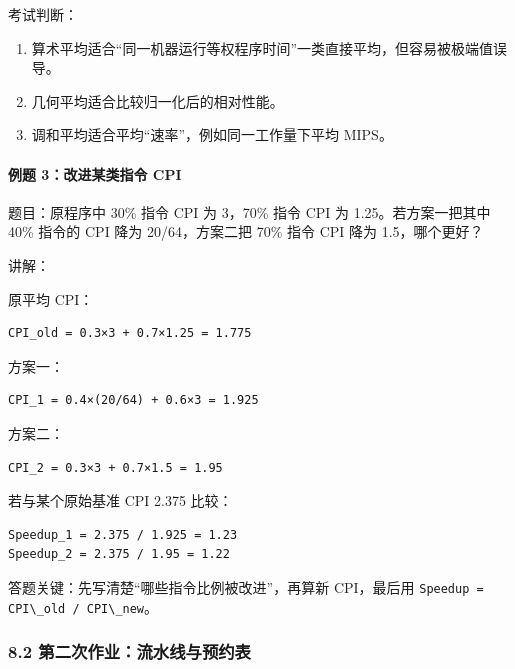 \documentclass[
]{ctexart}
\newcommand{\passthrough}[1]{#1}
\providecommand{\tightlist}{%
  \setlength{\itemsep}{0pt}\setlength{\parskip}{0pt}}
\begin{document}
考试判断：

\begin{enumerate}
\def\labelenumi{\arabic{enumi}.}
\tightlist
\item
  算术平均适合``同一机器运行等权程序时间''一类直接平均，但容易被极端值误导。
\item
  几何平均适合比较归一化后的相对性能。
\item
  调和平均适合平均``速率''，例如同一工作量下平均 MIPS。
\end{enumerate}

\paragraph{例题 3：改进某类指令
CPI}\label{ux4f8bux9898-3ux6539ux8fdbux67d0ux7c7bux6307ux4ee4-cpi}

题目：原程序中 30\% 指令 CPI 为 3，70\% 指令 CPI 为 1.25。若方案一把其中
40\% 指令的 CPI 降为 20/64，方案二把 70\% 指令 CPI 降为 1.5，哪个更好？

讲解：

原平均 CPI：

\begin{lstlisting}
CPI_old = 0.3×3 + 0.7×1.25 = 1.775
\end{lstlisting}

方案一：

\begin{lstlisting}
CPI_1 = 0.4×(20/64) + 0.6×3 = 1.925
\end{lstlisting}

方案二：

\begin{lstlisting}
CPI_2 = 0.3×3 + 0.7×1.5 = 1.95
\end{lstlisting}

若与某个原始基准 CPI 2.375 比较：

\begin{lstlisting}
Speedup_1 = 2.375 / 1.925 = 1.23
Speedup_2 = 2.375 / 1.95 = 1.22
\end{lstlisting}

答题关键：先写清楚``哪些指令比例被改进''，再算新 CPI，最后用
\passthrough{\lstinline!Speedup = CPI\_old / CPI\_new!}。

\subsubsection{8.2
第二次作业：流水线与预约表}\label{ux7b2cux4e8cux6b21ux4f5cux4e1aux6d41ux6c34ux7ebfux4e0eux9884ux7ea6ux8868}
\end{document}
